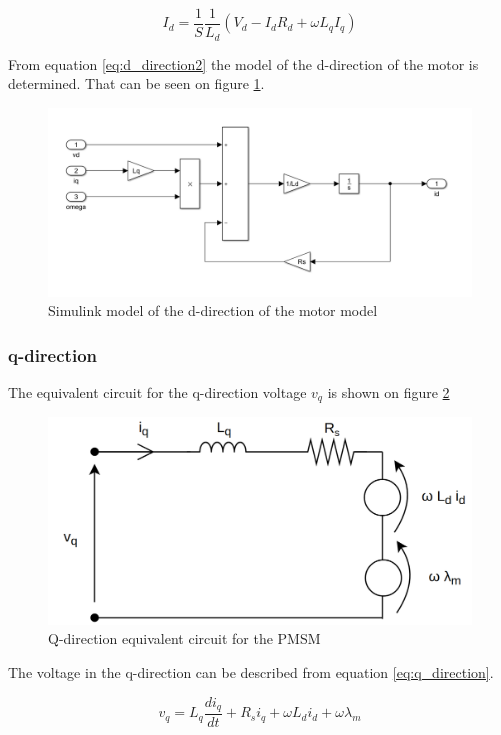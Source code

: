 \begin{equation}
    \label{eq:d_direction2}
    I_d = \frac{1}{S} \frac{1}{L_d} (V_d - I_d R_d + \omega L_q I_q)
\end{equation}

From equation \ref{eq:d_direction2} the model of the d-direction of the motor is determined. That can be seen on figure \ref{fig:simulink_d_direction}.

\begin{figure}[H]
	\centering
	\includegraphics[width=0.8\linewidth]{pictures/control/simulink_d_direction.PNG}
	\caption{Simulink model of the d-direction of the motor model}
	\label{fig:simulink_d_direction}
\end{figure}



\subsubsection{q-direction}
The equivalent circuit for the q-direction voltage $v_q$ is shown on figure \ref{fig:vq}

\begin{figure}[H]
	\centering
	\includegraphics[width=0.6\linewidth]{pictures/control/vq.png}
	\caption{Q-direction equivalent circuit for the PMSM}
	\label{fig:vq}
\end{figure}

The voltage in the q-direction can be described from equation \ref{eq:q_direction}.

\begin{equation}
\label{eq:q_direction}
    v_q = L_q\frac{d i_q}{dt} + R_s i_q + \omega L_d i_d + \omega \lambda_m
\end{equation}

